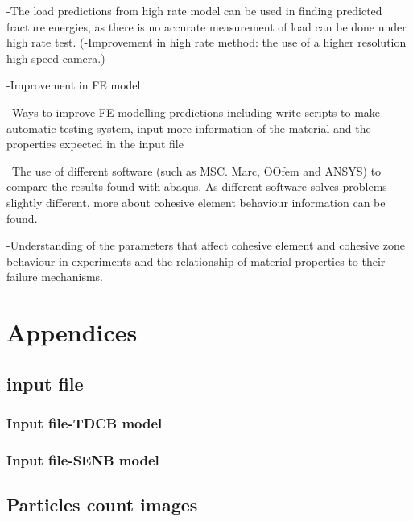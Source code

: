 \documentclass[numbers=noendperiod,chapterprefix=on]{icldt} %
\begin{document}
{-The load predictions from high rate model can be used in finding predicted fracture energies, as there is no accurate measurement of load can be done under high rate test.
(-Improvement in high rate method: the use of a higher resolution high speed camera.)

-Improvement in FE model:

~Ways to improve FE modelling predictions including write scripts to make automatic testing system, input more information of the material and the properties expected in the input file 

~The use of different software (such as MSC. Marc, OOfem and ANSYS) to compare the results found with abaqus. As different software solves problems slightly different, more about cohesive element behaviour information can be found.

-Understanding of the parameters that affect cohesive element and cohesive zone behaviour in experiments and the relationship of material properties to their failure mechanisms. 




\renewcommand{\bibname}{References}






\appendix
\chapter{Appendices} \label{Appendices}

\section{input file} \label{Appendices_input_file}

\subsection{Input file-TDCB model} 


\subsection{Input file-SENB model}


\section{Particles count images} \label{Appendices_particles_count}

}
\end{document}
